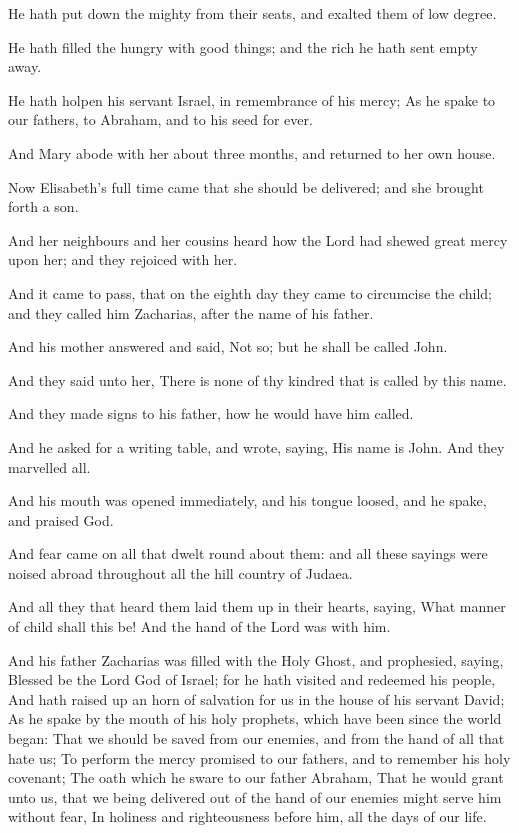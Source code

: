 \verse He hath put down the mighty from their seats, and exalted them of low degree.

\verse He hath filled the hungry with good things; and the rich he hath sent empty away.

\verse He hath holpen his servant Israel, in remembrance of his mercy; \verse As he spake to our fathers, to Abraham, and to his seed for ever.

\verse And Mary abode with her about three months, and returned to her own house.

\verse Now Elisabeth's full time came that she should be delivered; and she brought forth a son.

\verse And her neighbours and her cousins heard how the Lord had shewed great mercy upon her; and they rejoiced with her.

\verse And it came to pass, that on the eighth day they came to circumcise the child; and they called him Zacharias, after the name of his father.

\verse And his mother answered and said, Not so; but he shall be called John.

\verse And they said unto her, There is none of thy kindred that is called by this name.

\verse And they made signs to his father, how he would have him called.

\verse And he asked for a writing table, and wrote, saying, His name is John. And they marvelled all.

\verse And his mouth was opened immediately, and his tongue loosed, and he spake, and praised God.

\verse And fear came on all that dwelt round about them: and all these sayings were noised abroad throughout all the hill country of Judaea.

\verse And all they that heard them laid them up in their hearts, saying, What manner of child shall this be! And the hand of the Lord was with him.

\verse And his father Zacharias was filled with the Holy Ghost, and prophesied, saying, \verse Blessed be the Lord God of Israel; for he hath visited and redeemed his people, \verse And hath raised up an horn of salvation for us in the house of his servant David; \verse As he spake by the mouth of his holy prophets, which have been since the world began: \verse That we should be saved from our enemies, and from the hand of all that hate us; \verse To perform the mercy promised to our fathers, and to remember his holy covenant; \verse The oath which he sware to our father Abraham, \verse That he would grant unto us, that we being delivered out of the hand of our enemies might serve him without fear, \verse In holiness and righteousness before him, all the days of our life.

